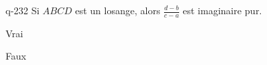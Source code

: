 \begin{truefalse}{q-232}
Si $ABCD$ est un losange, alors $\frac{d-b}{c-a}$ est imaginaire pur.
\item* Vrai
\item Faux
\end{truefalse}

